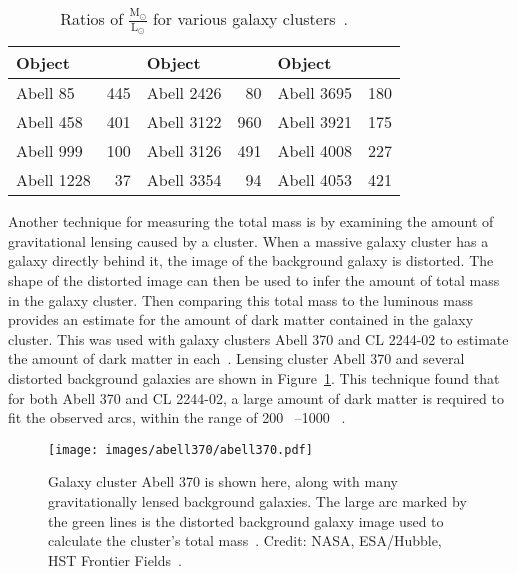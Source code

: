 \begin{table}[h]
  \centering
  \caption[Ratios of $\frac{\textrm{M}_\odot}{\textrm{L}_\odot}$ for Various Galaxy Clusters]{
    Ratios of $\frac{\textrm{M}_\odot}{\textrm{L}_\odot}$ for various galaxy clusters~\cite{cluster_ml_ratios}.
    }
  \label{tab:cluster_ml_ratios}
  \begin{tabular}{l r | l r | l r}
    Object & \mlratio{} & Object & \mlratio{} & Object & \mlratio{} \\
    \hline
    Abell   85 & 445 & Abell 2426 &  80 & Abell 3695 & 180 \\
    Abell  458 & 401 & Abell 3122 & 960 & Abell 3921 & 175 \\
    Abell  999 & 100 & Abell 3126 & 491 & Abell 4008 & 227 \\
    Abell 1228 &  37 & Abell 3354 &  94 & Abell 4053 & 421 \\
  \end{tabular}
\end{table}
    
Another technique for measuring the total mass is by examining the amount of gravitational lensing caused by a cluster.
When a massive galaxy cluster has a galaxy directly behind it, the image of the background galaxy is distorted.
The shape of the distorted image can then be used to infer the amount of total mass in the galaxy cluster.
Then comparing this total mass to the luminous mass provides an estimate for the amount of dark matter contained in the galaxy cluster.
This was used with galaxy clusters Abell 370 and CL 2244-02 to estimate the amount of dark matter in each~\cite{cluster_lensing}.
Lensing cluster Abell 370 and several distorted background galaxies are shown in Figure~\ref{fig:abell370}.
This technique found that for both Abell 370 and CL 2244-02, a large amount of dark matter is required to fit the observed arcs, within the range of \SIrange{200}{1000}{ }.
    
\begin{figure}[!ht]
  \centering
  \texttt{[image: images/abell370/abell370.pdf]}
  \caption[Gravitational Lensing in Abell 370]{
    Galaxy cluster Abell 370 is shown here, along with many gravitationally lensed background galaxies.
    The large arc marked by the green lines is the distorted background galaxy image used to calculate the cluster's total mass~\cite{cluster_lensing}.
    Credit: NASA, ESA/Hubble, HST Frontier Fields~\cite{abell370_hubble}.
  }
  \label{fig:abell370}
\end{figure}
    

